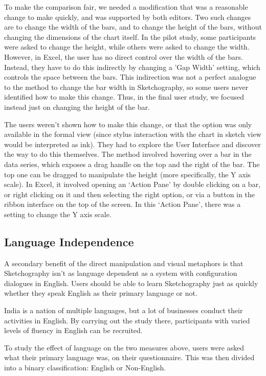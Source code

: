 To make the comparison fair, we needed a modification that was a reasonable change to make quickly, and was supported by both editors. Two such changes are to change the width of the bars, and to change the height of the bars, without changing the dimensions of the chart itself. In the pilot study, some participants were asked to change the height, while others were asked to change the width. However, in Excel, the user has no direct control over the width of the bars. Instead, they have to do this indirectly by changing a 'Gap Width' setting, which controls the space between the bars. This indirection was not a perfect analogue to the method to change the bar width in Sketchography, so some users never identified how to make this change. Thus, in the final user study, we focused instead just on changing the height of the bar.

The users weren't shown how to make this change, or that the option was only available in the formal view (since stylus interaction with the chart in sketch view would be interpreted as ink). They had to explore the User Interface and discover the way to do this themselves. The method involved hovering over a bar in the data series, which exposes a drag handle on the top and the right of the bar. The top one can be dragged to manipulate the height (more specifically, the Y axis scale). In Excel, it involved opening an `Action Pane' by double clicking on a bar, or right clicking on it and then selecting the right option, or via a button in the ribbon interface on the top of the screen. In this `Action Pane', there was a setting to change the Y axis scale.

\subsection*{Language Independence}
A secondary benefit of the direct manipulation and visual metaphors is that Sketchography isn't as language dependent as a system with configuration dialogues in English. Users should be able to learn Sketchography just as quickly whether they speak English as their primary language or not. 

India is a nation of multiple languages, but a lot of businesses conduct their activities in English. By carrying out the study there, participants with varied levels of fluency in English can be recruited.

To study the effect of language on the two measures above, users were asked what their primary language was, on their questionnaire. This was then divided into a binary classification: English or Non-English.

